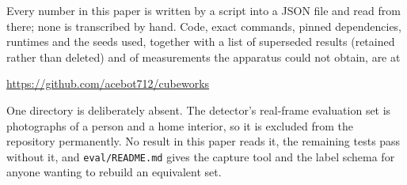 \documentclass{article}
\begin{document}
Every number in this paper is written by a script into a JSON file and read from
there; none is transcribed by hand. Code, exact commands, pinned dependencies,
runtimes and the seeds used, together with a list of superseded results (retained
rather than deleted) and of measurements the apparatus could not obtain, are at
\begin{center}
\url{https://github.com/acebot712/cubeworks}
\end{center}

One directory is deliberately absent. The detector's real-frame evaluation set is
photographs of a person and a home interior, so it is excluded from the
repository permanently. No result in this paper reads it, the remaining tests
pass without it, and \texttt{eval/README.md} gives the capture tool and the label
schema for anyone wanting to rebuild an equivalent set.



\end{document}
